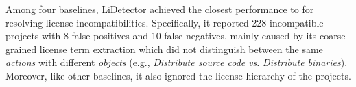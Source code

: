 Among four baselines, LiDetector achieved the closest performance to \tool for resolving license incompatibilities. Specifically, it reported 228 incompatible projects with 8 false positives and 10 false negatives, 
mainly caused by its coarse-grained license term extraction which did not distinguish between the same \textit{actions} with different \textit{objects} (e.g., \textit{Distribute source code} \textit{vs.} \textit{Distribute binaries}). Moreover, like other baselines, it also ignored the license hierarchy of the projects. 

\begin{table}[]
	\centering
	\footnotesize
	\caption{Comparison on License Incompatibility Localization} \label{tab:incom}
\end{table}


